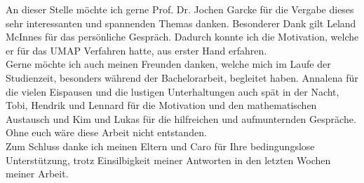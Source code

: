 \documentclass[
11pt, %
ngerman,
singlespacing, %
headsepline, %
]{MastersDoctoralThesis} %
\author{Christopher Reiners} %
\date{6. August 2019}  %
\begin{document}
\frontmatter %

\pagestyle{plain} %


\selectfont
\maketitle






\begin{acknowledgements}

\begin{changemargin}{1.5cm}{1.5cm}
\vspace*{0.03\textheight}

An dieser Stelle möchte ich gerne Prof. Dr. Jochen Garcke für die Vergabe dieses sehr interessanten 
und spannenden Themas danken. Besonderer Dank gilt Leland McInnes für das persönliche Gespräch. 
Dadurch konnte ich die Motivation, welche er für das UMAP Verfahren hatte, aus erster Hand erfahren. \\

Gerne möchte ich auch meinen Freunden danken, welche mich im Laufe der Studienzeit, besonders 
während der Bachelorarbeit, begleitet haben. Annalena für die vielen Eispausen und die lustigen Unterhaltungen 
auch spät in der Nacht, Tobi, Hendrik und Lennard für die Motivation und den mathematischen Austausch und Kim und Lukas 
für die hilfreichen und aufmunternden Gespräche. Ohne euch wäre diese Arbeit nicht entstanden. \\

Zum Schluss danke ich meinen Eltern und Caro für Ihre bedingungslose Unterstützung, trotz Einsilbigkeit meiner Antworten 
in den letzten Wochen meiner Arbeit.

\end{changemargin}

\end{acknowledgements}
\end{document}

